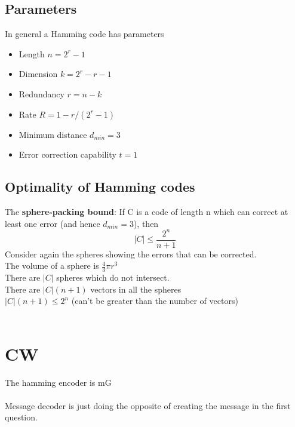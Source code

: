 \documentclass{article}[18pt]
\begin{document}
\subsection{Parameters}
In general a Hamming code has parameters
\begin{itemize}
	\item Length $n=2^r-1$
	\item Dimension $k=2^r-r-1$
	\item Redundancy $r=n-k$
	\item Rate $R=1-r/(2^r-1)$
	\item Minimum distance $d_{min}=3$
	\item Error correction capability $t=1$
\end{itemize}
\subsection{Optimality of Hamming codes}
The \textbf{sphere-packing bound}: If C is a code of length n which can correct at least one error (and hence $d_{min}=3$), then
$$| C | \leq \frac { 2 ^ { n } } { n + 1 }$$
Consider again the spheres showing the errors that can be corrected.\\
The volume of a sphere is $\frac{4}{3}\pi r^3$\\
There are $|C|$ spheres which do not intersect.\\
There are $|C|(n+1)$ vectors in all the spheres\\
$|C|(n+1)\leqslant 2^n$ (can't be greater than the number of vectors)\\
\\
\section{CW}
The hamming encoder is mG\\
\\
Message decoder is just doing the opposite of creating the message in the first question.\\
\\
\end{document}
